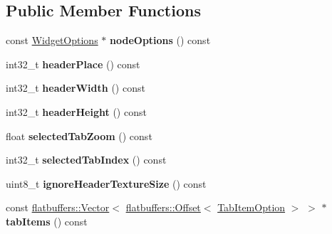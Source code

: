 \subsection*{Public Member Functions}
\begin{DoxyCompactItemize}
\item 
\mbox{\label{structflatbuffers_1_1TabControlOption_a8ab557570f5080fb47d30bb44400a245}} 
const \hyperlink{structflatbuffers_1_1WidgetOptions}{Widget\+Options} $\ast$ {\bfseries node\+Options} () const
\item 
\mbox{\label{structflatbuffers_1_1TabControlOption_ac09a83ee1109d906561b840c46e10c16}} 
int32\+\_\+t {\bfseries header\+Place} () const
\item 
\mbox{\label{structflatbuffers_1_1TabControlOption_a573f1eb5f7698f1a0f70a0a59d3f1110}} 
int32\+\_\+t {\bfseries header\+Width} () const
\item 
\mbox{\label{structflatbuffers_1_1TabControlOption_aba886a4a383f0aec411b8d54085d00e5}} 
int32\+\_\+t {\bfseries header\+Height} () const
\item 
\mbox{\label{structflatbuffers_1_1TabControlOption_a3f13ebebd45c3cdc5b40f0d4d89b700d}} 
float {\bfseries selected\+Tab\+Zoom} () const
\item 
\mbox{\label{structflatbuffers_1_1TabControlOption_a5ad7da9da0ffc145430d39f4e2e13d83}} 
int32\+\_\+t {\bfseries selected\+Tab\+Index} () const
\item 
\mbox{\label{structflatbuffers_1_1TabControlOption_a10ae4b6e9e969b746e47a0d743810737}} 
uint8\+\_\+t {\bfseries ignore\+Header\+Texture\+Size} () const
\item 
\mbox{\label{structflatbuffers_1_1TabControlOption_a6ef05b9694a4c4c34ec095641f725084}} 
const \hyperlink{classflatbuffers_1_1Vector}{flatbuffers\+::\+Vector}$<$ \hyperlink{structflatbuffers_1_1Offset}{flatbuffers\+::\+Offset}$<$ \hyperlink{structflatbuffers_1_1TabItemOption}{Tab\+Item\+Option} $>$ $>$ $\ast$ {\bfseries tab\+Items} () const

\end{DoxyCompactItemize}
